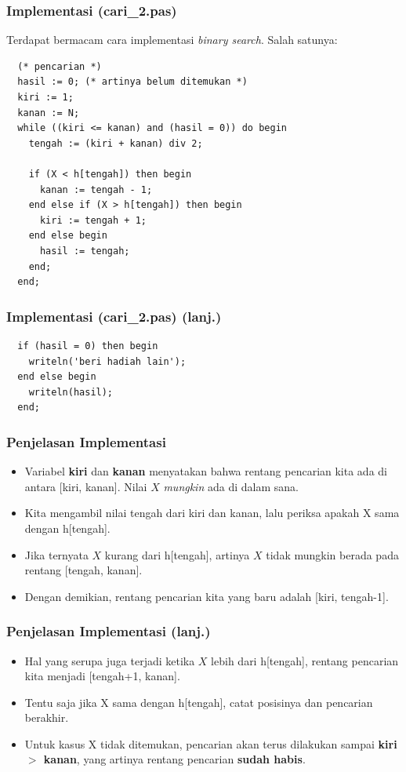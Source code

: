 \begin{frame}[fragile]
\frametitle{Implementasi (cari\_2.pas)}
Terdapat bermacam cara implementasi \textit{binary search}. Salah satunya:
\begin{lstlisting}
  (* pencarian *)
  hasil := 0; (* artinya belum ditemukan *)
  kiri := 1;
  kanan := N;
  while ((kiri <= kanan) and (hasil = 0)) do begin
    tengah := (kiri + kanan) div 2;

    if (X < h[tengah]) then begin
      kanan := tengah - 1;
    end else if (X > h[tengah]) then begin
      kiri := tengah + 1;
    end else begin
      hasil := tengah;
    end;
  end;
\end{lstlisting}
\end{frame}

\begin{frame}[fragile]
\frametitle{Implementasi (cari\_2.pas) (lanj.)}
\begin{lstlisting}
  if (hasil = 0) then begin
    writeln('beri hadiah lain');
  end else begin
    writeln(hasil);
  end;
\end{lstlisting}
\end{frame}

\begin{frame}
\frametitle{Penjelasan Implementasi}
\begin{itemize}
  \item Variabel \textbf{kiri} dan \textbf{kanan} menyatakan bahwa rentang pencarian kita ada di antara [kiri, kanan]. Nilai $X$ \textit{mungkin} ada di dalam sana.
  \item Kita mengambil nilai tengah dari kiri dan kanan, lalu periksa apakah X sama dengan h[tengah].
  \item Jika ternyata $X$ kurang dari h[tengah], artinya $X$ tidak mungkin berada pada rentang [tengah, kanan].
  \item Dengan demikian, rentang pencarian kita yang baru adalah [kiri, tengah-1].
\end{itemize}
\end{frame}

\begin{frame}
\frametitle{Penjelasan Implementasi (lanj.)}
\begin{itemize}
  \item Hal yang serupa juga terjadi ketika $X$ lebih dari h[tengah], rentang pencarian kita menjadi [tengah+1, kanan].
  \item Tentu saja jika X sama dengan h[tengah], catat posisinya dan pencarian berakhir.
  \item Untuk kasus X tidak ditemukan, pencarian akan terus dilakukan sampai \textbf{kiri $>$ kanan}, yang artinya rentang pencarian \textbf{sudah habis}.
\end{itemize}
\end{frame}

